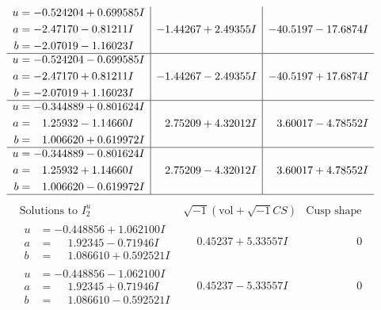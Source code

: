 \documentclass[1p]{elsarticle_modified}
\theoremstyle{definition}
\newcommand{\I}{\sqrt{-1}}
\begin{document}
$$\begin{array}{c|c|c}
\begin{aligned}
u &= -0.524204 + 0.699585 I \\
a &= -2.47170 - 0.81211 I \\
b &= -2.07019 - 1.16023 I\end{aligned}
 & -1.44267 + 2.49355 I & -40.5197 - 17.6874 I \\ \hline\begin{aligned}
u &= -0.524204 - 0.699585 I \\
a &= -2.47170 + 0.81211 I \\
b &= -2.07019 + 1.16023 I\end{aligned}
 & -1.44267 - 2.49355 I & -40.5197 + 17.6874 I \\ \hline\begin{aligned}
u &= -0.344889 + 0.801624 I \\
a &= \phantom{-}1.25932 - 1.14660 I \\
b &= \phantom{-}1.006620 + 0.619972 I\end{aligned}
 & \phantom{-}2.75209 + 4.32012 I & \phantom{-}3.60017 - 4.78552 I \\ \hline\begin{aligned}
u &= -0.344889 - 0.801624 I \\
a &= \phantom{-}1.25932 + 1.14660 I \\
b &= \phantom{-}1.006620 - 0.619972 I\end{aligned}
 & \phantom{-}2.75209 - 4.32012 I & \phantom{-}3.60017 + 4.78552 I\\
 \hline 
 \end{array}$$\newpage$$\begin{array}{c|c|c}  
\text{Solutions to }I^u_{2}& \I (\text{vol} + \sqrt{-1}CS) & \text{Cusp shape}\\
 \hline 
\begin{aligned}
u &= -0.448856 + 1.062100 I \\
a &= \phantom{-}1.92345 - 0.71946 I \\
b &= \phantom{-}1.086610 + 0.592521 I\end{aligned}
 & \phantom{-}0.45237 + 5.33557 I & \phantom{-0.000000 } 0 \\ \hline\begin{aligned}
u &= -0.448856 - 1.062100 I \\
a &= \phantom{-}1.92345 + 0.71946 I \\
b &= \phantom{-}1.086610 - 0.592521 I\end{aligned}
 & \phantom{-}0.45237 - 5.33557 I & \phantom{-0.000000 } 0 \\ \hline\begin{aligned}

\end{aligned}
\end{array}$$
\end{document}

